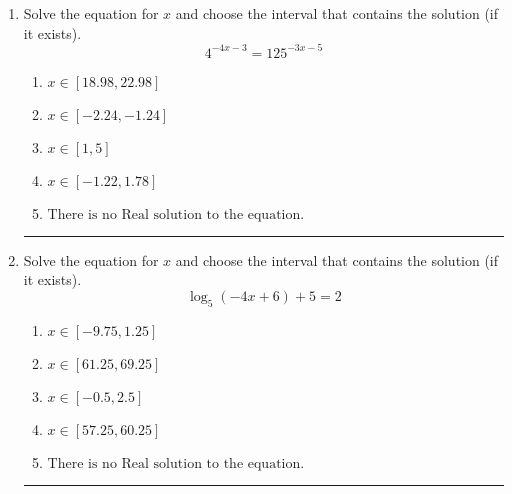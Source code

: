 \documentclass[14pt]{extbook}
\newcommand{\litem}[1]{\item#1\hspace*{-1cm}\rule{\textwidth}{0.4pt}}
\begin{document}
\begin{enumerate}
{\begin{enumerate}[label=\Alph*.]
\end{enumerate} }
\litem{
Solve the equation for $x$ and choose the interval that contains the solution (if it exists).\[ 4^{-4x-3} = 125^{-3x-5} \]\begin{enumerate}[label=\Alph*.]
\item \( x \in [18.98, 22.98] \)
\item \( x \in [-2.24, -1.24] \)
\item \( x \in [1, 5] \)
\item \( x \in [-1.22, 1.78] \)
\item \( \text{There is no Real solution to the equation.} \)

\end{enumerate} }
\litem{
Solve the equation for $x$ and choose the interval that contains the solution (if it exists).\[ \log_{5}{(-4x+6)}+5 = 2 \]\begin{enumerate}[label=\Alph*.]
\item \( x \in [-9.75, 1.25] \)
\item \( x \in [61.25, 69.25] \)
\item \( x \in [-0.5, 2.5] \)
\item \( x \in [57.25, 60.25] \)
\item \( \text{There is no Real solution to the equation.} \)

\end{enumerate} }
\end{enumerate}
\end{document}
